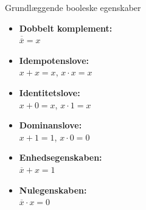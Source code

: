 \begin{custombox}{Grundlæggende booleske egenskaber}
\begin{itemize}
    \item \textbf{Dobbelt komplement:} \\
    \hspace*{15pt} $\overline{\overline{x}} = x$\hspace{15pt}
    
    \item \textbf{Idempotenslove:} \\
    \hspace*{15pt}$x + x = x$, \quad $x \cdot x = x$
    
    \item \textbf{Identitetslove:} \\
    \hspace*{15pt}$x + 0 = x$, \quad $x \cdot 1 = x$
    
    \item \textbf{Dominanslove:} \\
    \hspace*{15pt}$x + 1 = 1$, \quad $x \cdot 0 = 0$
    
    \item \textbf{Enhedsegenskaben:} \\
    \hspace*{15pt}$\overline{x} + x = 1$
    
    \item \textbf{Nulegenskaben:} \\
    \hspace*{15pt} $\overline{x} \cdot x = 0$
\end{itemize}
\end{custombox}

